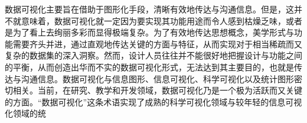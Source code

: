 	数据可视化主要旨在借助于图形化手段，清晰有效地传达与沟通信息。但是，这并不就意味着，数据可视化就一定因为要实现其功能用途而令人感到枯燥乏味，或者是为了看上去绚丽多彩而显得极端复杂。为了有效地传达思想概念，美学形式与功能需要齐头并进，通过直观地传达关键的方面与特征，从而实现对于相当稀疏而又复杂的数据集的深入洞察。然而，设计人员往往并不能很好地把握设计与功能之间的平衡，从而创造出华而不实的数据可视化形式，无法达到其主要目的，也就是传达与沟通信息。数据可视化与信息图形、信息可视化、科学可视化以及统计图形密切相关。当前，在研究、教学和开发领域，数据可视化乃是一个极为活跃而又关键的方面。“数据可视化”这条术语实现了成熟的科学可视化领域与较年轻的信息可视化领域的统